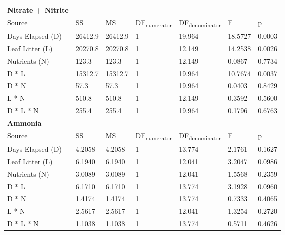 \begin{table}
\label{tab:nut_anova}
\begin{tabular}{ l l l l l l l }
\textbf{Nitrate + Nitrite} & & & & & &\\
Source           & SS       & MS       & DF\textsubscript{numerator} & DF\textsubscript{denominator} & F       & p  \\
Days Elapsed (D) & 26412.9  & 26412.9  & 1                           & 19.964                        & 18.5727 & 0.0003 \\
Leaf Litter (L)  & 20270.8  & 20270.8  & 1                           & 12.149                        & 14.2538 & 0.0026 \\
Nutrients (N)    & 123.3    & 123.3    & 1                           & 12.149                        & 0.0867  & 0.7734 \\
D * L            & 15312.7  & 15312.7  & 1                           & 19.964                        & 10.7674 & 0.0037 \\
D * N            & 57.3     & 57.3     & 1                           & 19.964                        & 0.0403  & 0.8429 \\
L * N            & 510.8    & 510.8    & 1                           & 12.149                        & 0.3592  & 0.5600 \\
D * L * N        & 255.4    & 255.4    & 1                           & 19.964                        & 0.1796  & 0.6763 \\

\textbf{Ammonia} & & & & & &\\
Source           & SS      & MS     & DF\textsubscript{numerator} & DF\textsubscript{denominator} & F       & p  \\
Days Elapsed (D) & 4.2058  & 4.2058 & 1                           & 13.774                        & 2.1761  & 0.1627 \\
Leaf Litter (L)  & 6.1940  & 6.1940 & 1                           & 12.041                        & 3.2047  & 0.0986 \\
Nutrients (N)    & 3.0089  & 3.0089 & 1                           & 12.041                        & 1.5568  & 0.2359 \\
D * L            & 6.1710  & 6.1710 & 1                           & 13.774                        & 3.1928  & 0.0960 \\
D * N            & 1.4174  & 1.4174 & 1                           & 13.774                        & 0.7333  & 0.4065 \\
L * N            & 2.5617  & 2.5617 & 1                           & 12.041                        & 1.3254  & 0.2720 \\
D * L * N        & 1.1038  & 1.1038 & 1                           & 13.774                        & 0.5711  & 0.4626 \\


\end{tabular}
\end{table}
